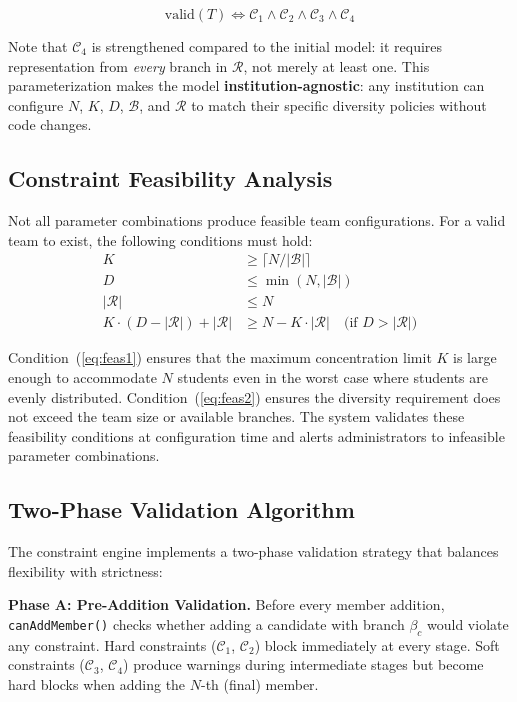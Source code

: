 \documentclass[conference]{IEEEtran}
\begin{document}
\begin{equation}
    \text{valid}(T) \iff \mathcal{C}_1 \wedge \mathcal{C}_2 \wedge \mathcal{C}_3 \wedge \mathcal{C}_4
\end{equation}

Note that $\mathcal{C}_4$ is strengthened compared to the initial model: it requires representation from \textit{every} branch in $\mathcal{R}$, not merely at least one. This parameterization makes the model \textbf{institution-agnostic}: any institution can configure $N$, $K$, $D$, $\mathcal{B}$, and $\mathcal{R}$ to match their specific diversity policies without code changes.

\subsection{Constraint Feasibility Analysis}

Not all parameter combinations produce feasible team configurations. For a valid team to exist, the following conditions must hold:
\begin{align}
    K &\geq \lceil N / |\mathcal{B}| \rceil \label{eq:feas1} \\
    D &\leq \min(N, |\mathcal{B}|) \label{eq:feas2} \\
    |\mathcal{R}| &\leq N \label{eq:feas3} \\
    K \cdot (D - |\mathcal{R}|) + |\mathcal{R}| &\geq N - K \cdot |\mathcal{R}| \quad \text{(if } D > |\mathcal{R}|\text{)} \label{eq:feas4}
\end{align}

Condition~(\ref{eq:feas1}) ensures that the maximum concentration limit $K$ is large enough to accommodate $N$ students even in the worst case where students are evenly distributed. Condition~(\ref{eq:feas2}) ensures the diversity requirement does not exceed the team size or available branches. The system validates these feasibility conditions at configuration time and alerts administrators to infeasible parameter combinations.

\subsection{Two-Phase Validation Algorithm}

The constraint engine implements a two-phase validation strategy that balances flexibility with strictness:

\textbf{Phase A: Pre-Addition Validation.} Before every member addition, \texttt{canAddMember()} checks whether adding a candidate with branch $\beta_c$ would violate any constraint. Hard constraints ($\mathcal{C}_1$, $\mathcal{C}_2$) block immediately at every stage. Soft constraints ($\mathcal{C}_3$, $\mathcal{C}_4$) produce warnings during intermediate stages but become hard blocks when adding the $N$-th (final) member.
\end{document}
